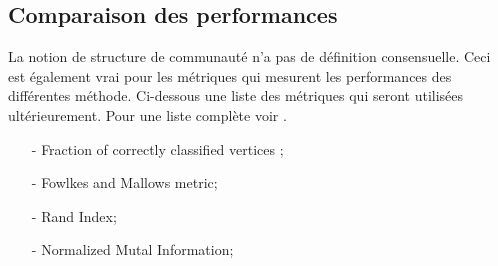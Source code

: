 \subsection{Comparaison des performances}
La notion de structure de communauté n'a pas de définition consensuelle.
Ceci est également vrai pour les métriques qui mesurent les performances des différentes méthode.
Ci-dessous une liste des métriques qui seront utilisées ultérieurement.
Pour une liste complète voir \cite[p.77-79]{Community_detection_in_graphs}.
\begin{itemize}
	\item[-] Fraction of correctly classified vertices ; 
	\item[-] Fowlkes and Mallows metric; 
	\item[-] Rand Index; 
	\item[-] Normalized Mutal Information; 
\end{itemize}